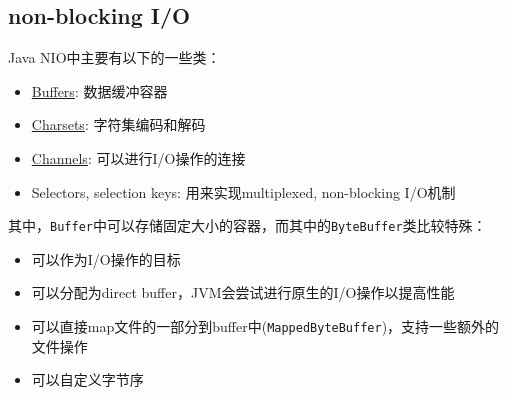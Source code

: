 \documentclass[12pt]{article}
\begin{document}
\begin{Shaded}
\begin{Highlighting}[]
                \OperatorTok{=} \OperatorTok{;}
                 \OperatorTok{(!}\OperatorTok{(}\OperatorTok{))} \OperatorTok{\{}
\OperatorTok{=}\OperatorTok{();}
\OperatorTok{(}\OperatorTok{+} \OperatorTok{);}
\OperatorTok{();}
                \OperatorTok{\}}
            \OperatorTok{\}}  \OperatorTok{(}\OperatorTok{)} \OperatorTok{\{}
\OperatorTok{();}
            \OperatorTok{\}}
        \OperatorTok{\};}
    \OperatorTok{\}}
\OperatorTok{\}}
\end{Highlighting}
\end{Shaded}

\subsection{non-blocking I/O}\label{non-blocking-io-1}

Java NIO中主要有以下的一些类：

\begin{itemize}
\tightlist
\item
  \href{https://docs.oracle.com/javase/8/docs/api/java/nio/package-summary.html\#buffers}{Buffers}: 数据缓冲容器
\item
  \href{https://docs.oracle.com/javase/8/docs/api/java/nio/charset/package-summary.html}{Charsets}: 字符集编码和解码
\item
  \href{https://docs.oracle.com/javase/8/docs/api/java/nio/channels/package-summary.html}{Channels}: 可以进行I/O操作的连接
\item
  Selectors, selection keys: 用来实现multiplexed, non-blocking I/O机制
\end{itemize}

其中，\texttt{Buffer}中可以存储固定大小的容器，而其中的\texttt{ByteBuffer}类比较特殊：

\begin{itemize}
\tightlist
\item
  可以作为I/O操作的目标
\item
  可以分配为direct buffer，JVM会尝试进行原生的I/O操作以提高性能
\item
  可以直接map文件的一部分到buffer中(\texttt{MappedByteBuffer})，支持一些额外的文件操作
\item
  可以自定义字节序
\end{itemize}
\end{document}
